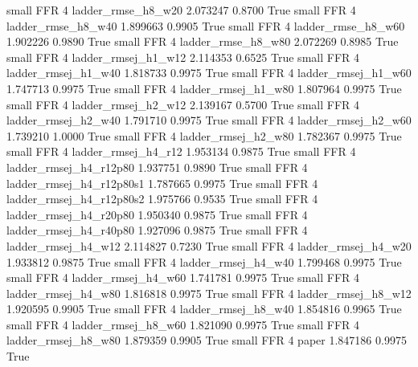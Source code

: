      small      FFR                 4       ladder_rmse_h8_w20   2.073247      0.8700    True
     small      FFR                 4       ladder_rmse_h8_w40   1.899663      0.9905    True
     small      FFR                 4       ladder_rmse_h8_w60   1.902226      0.9890    True
     small      FFR                 4       ladder_rmse_h8_w80   2.072269      0.8985    True
     small      FFR                 4      ladder_rmsej_h1_w12   2.114353      0.6525    True
     small      FFR                 4      ladder_rmsej_h1_w40   1.818733      0.9975    True
     small      FFR                 4      ladder_rmsej_h1_w60   1.747713      0.9975    True
     small      FFR                 4      ladder_rmsej_h1_w80   1.807964      0.9975    True
     small      FFR                 4      ladder_rmsej_h2_w12   2.139167      0.5700    True
     small      FFR                 4      ladder_rmsej_h2_w40   1.791710      0.9975    True
     small      FFR                 4      ladder_rmsej_h2_w60   1.739210      1.0000    True
     small      FFR                 4      ladder_rmsej_h2_w80   1.782367      0.9975    True
     small      FFR                 4      ladder_rmsej_h4_r12   1.953134      0.9875    True
     small      FFR                 4   ladder_rmsej_h4_r12p80   1.937751      0.9890    True
     small      FFR                 4 ladder_rmsej_h4_r12p80s1   1.787665      0.9975    True
     small      FFR                 4 ladder_rmsej_h4_r12p80s2   1.975766      0.9535    True
     small      FFR                 4   ladder_rmsej_h4_r20p80   1.950340      0.9875    True
     small      FFR                 4   ladder_rmsej_h4_r40p80   1.927096      0.9875    True
     small      FFR                 4      ladder_rmsej_h4_w12   2.114827      0.7230    True
     small      FFR                 4      ladder_rmsej_h4_w20   1.933812      0.9875    True
     small      FFR                 4      ladder_rmsej_h4_w40   1.799468      0.9975    True
     small      FFR                 4      ladder_rmsej_h4_w60   1.741781      0.9975    True
     small      FFR                 4      ladder_rmsej_h4_w80   1.816818      0.9975    True
     small      FFR                 4      ladder_rmsej_h8_w12   1.920595      0.9905    True
     small      FFR                 4      ladder_rmsej_h8_w40   1.854816      0.9965    True
     small      FFR                 4      ladder_rmsej_h8_w60   1.821090      0.9975    True
     small      FFR                 4      ladder_rmsej_h8_w80   1.879359      0.9905    True
     small      FFR                 4                    paper   1.847186      0.9975    True
